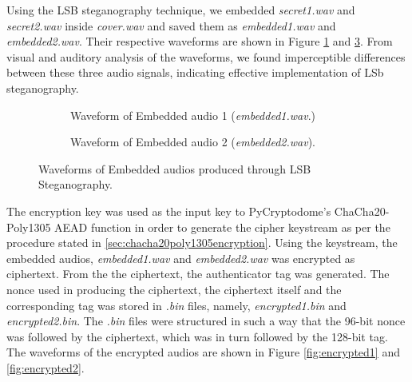 \documentclass[a4paper]{cas-sc}
\begin{document}
Using the LSB steganography technique, we embedded \textit{secret1.wav} and \textit{secret2.wav} inside \textit{cover.wav} and saved them as \textit{embedded1.wav} and \textit{embedded2.wav}. Their respective waveforms are shown in Figure \ref{fig:embeddedAudio1} and \ref{fig:embeddedAudio2}. From visual and auditory analysis of the waveforms, we found imperceptible differences between these three audio signals, indicating effective implementation of LSb steganography.
\begin{figure}[pos=h]
    \begin{subfigure}[!h]{0.45\textwidth}
        \begin{center}
            \centering
            
            \caption{Waveform of Embedded audio 1 (\textit{embedded1.wav}.)}
            \label{fig:embeddedAudio1}
        \end{center}
    \end{subfigure}
    \hfill
    \begin{subfigure}[!h]{0.45\textwidth}
        \begin{center}
            
            \caption{Waveform of Embedded audio 2 (\textit{embedded2.wav}).}
            \label{fig:embeddedAudio2}
        \end{center}
    \end{subfigure}
    \caption{Waveforms of Embedded audios produced through LSB Steganography.}
\end{figure}

The encryption key was used as the input key to PyCryptodome's ChaCha20-Poly1305 AEAD function in order to generate the cipher keystream as per the procedure stated in \ref{sec:chacha20poly1305encryption}. Using the keystream, the embedded audios, \textit{embedded1.wav} and \textit{embedded2.wav} was encrypted as ciphertext. From the the ciphertext, the authenticator tag was generated. The nonce used in producing the ciphertext, the ciphertext itself and the corresponding tag was stored in \textit{.bin} files, namely, \textit{encrypted1.bin} and \textit{encrypted2.bin}. The \textit{.bin} files were structured in such a way that the 96-bit nonce was followed by the ciphertext, which was in turn followed by the 128-bit tag. The waveforms of the encrypted audios are shown in Figure \ref{fig:encrypted1} and \ref{fig:encrypted2}.
\end{document}
